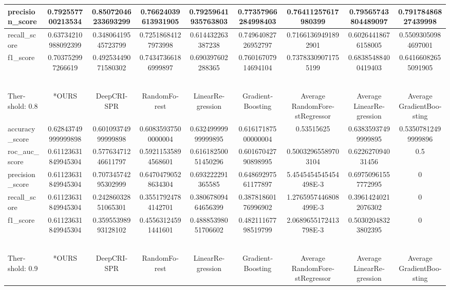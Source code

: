 \documentclass[12pt,a4paper,BCOR=.7cm,headsepline,bibliography=totoc]{report}
\begin{document}
\begin{table}[H]
\begin{latin}
\begin{adjustbox}{center}
{\begin{tabularx}{2.13\textwidth}{| l | c | c | c | c | c | c | c | c | }
	precision\_score & 0.792557700213534 & 0.85072046233693299 & 0.76624039613931905 & 0.79259641935763803 & 0.77357966284998403 & 0.76411257617980399 & 0.79565743804489097 & 0.79178486827439998 \\ \hline
	recall\_score & 0.63734210988092399 & 0.34806419545723799 & 0.72518684127973998 & 0.614432263387238 & 0.74964082726952797 & 0.71661369491892901 & 0.60264418676158005 & 0.55093050984697001 \\ \hline
	f1\_score & 0.703752997266619 & 0.49253449071580302 & 0.74347366186999897 & 0.690397602288365 & 0.76016707914694104 & 0.73783309071755199 & 0.68385488400419403 & 0.64166082655091905 \\ \hline
	\  & \  & \  & \  & \  & \  & \  & \  & \  \\ \hline
	\rowcolor{SeaGreen}\multicolumn{9}{|c|}{Classification}  \\ \hline
	Thershold: 0.8 & *OURS & DeepCRISPR & RandomForest & LinearRegression	 & GradientBoosting 	 & Average RandomForestRegressor & Average LinearRegression & Average GradientBoosting \\ \hline
	accuracy\_score & 0.62843749999999898 & 0.60109374999999898 & 0.60835937500000004 & 0.63249999999999895 & 0.61617187500000004 & 0.53515625 & 0.63835937499999895 & 0.53507812499999896 \\ \hline
	roc\_auc\_score & 0.61123631849945304 & 0.57763471246611797 & 0.59211535894568601 & 0.61618250051450296 & 0.60167042790898995 & 0.50032965589703104 & 0.622627094031456 & 0.5 \\ \hline
	precision\_score & 0.61123631849945304 & 0.70734574295302999 & 0.64704790528634304 & 0.693222291365585 & 0.64869297561177897 & 5.4545454545454498E-3 & 0.69750961557772995 & 0 \\ \hline
	recall\_score & 0.61123631849945304 & 0.24286032851065301 & 0.35517924784142701 & 0.38067809464656399 & 0.38781860176996902 & 1.2765957446808499E-3 & 0.39614240212076302 & 0 \\ \hline
	f1\_score & 0.61123631849945304 & 0.35955398993128102 & 0.45563124591441601 & 0.48885398051706602 & 0.48211167798519799 & 2.0689655172413798E-3 & 0.50302048323802395 & 0 \\ \hline
	\  & \  & \  & \  & \  & \  & \  & \  & \  \\ \hline
	\rowcolor{SeaGreen}\multicolumn{9}{|c|}{Classification}  \\ \hline
	Thershold: 0.9 & *OURS & DeepCRISPR & RandomForest & LinearRegression	 & GradientBoosting 	 & Average RandomForestRegressor & Average LinearRegression & Average GradientBoosting \\ \hline

\end{tabularx}}
\end{adjustbox}
\end{latin}
\end{table}
\end{document}
